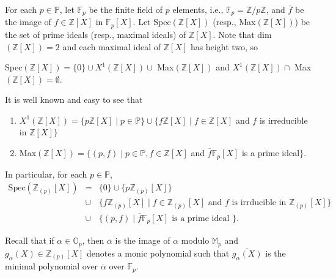 \documentclass[10pt]{article}
\numberwithin{equation}{section}
\theoremstyle{definition}
\theoremstyle{definition}
\newcommand{\F}{\mathbb{F}}
\newcommand{\Q}{\mathbb{Q}}
\newcommand{\Z}{\mathbb{Z}}
\newcommand{\PP}{\mathbb{P}}
\begin{document}
For each $p \in \PP$, let $\mathbb{F}_p$ be the finite field of $p$ elements, i.e., 
$\mathbb{F}_p = \mathbb{Z}/p\mathbb{Z}$, and $\overline{f}$ be the image of $f \in \mathbb{Z}[X]$ in $\mathbb{F}_p[X]$.
Let Spec$(\Z[X])$ (resp., Max$(\Z[X])$) be the set of prime ideals (resp., maximal ideals) of $\Z[X]$.
Note that dim$(\Z[X]) =2$ and each maximal ideal of $\Z[X]$ has height two,
so
\begin{center}
Spec$(\Z[X]) = \{0\} \cup X^1(\Z[X]) \cup$ Max$(\Z[X])$ and $X^1(\Z[X]) \cap$ Max$(\Z[X]) = \emptyset$.
\end{center}
It is well known and easy to see that
\begin{enumerate}
\item[(a)] $X^1(\Z[X]) = \{p\Z[X] \mid p \in \PP\} \cup \{f\Z[X] \mid f\in\Z[X]$ and $f$ is irreducible in $\Z[X]\}$
\item[(b)] Max$(\Z[X]) = \{(p, f) \mid p \in \PP, f\in\Z[X]$ and $\overline{f}\F_p[X]$ is a prime ideal$\}$.
\end{enumerate}
In particular, for each $p \in \PP$,
\begin{eqnarray*}
\text{Spec}(\Z_{(p)}[X]) &=& \{0\} \cup  \{p\Z_{(p)}[X]\}\\
                         &\cup& \{f\Z_{(p)}[X] \mid f\in\Z_{(p)}[X] \text{ and }f \text{ is irrducible in  }\Z_{(p)}[X]\} \\
&\cup&\{(p, f) \mid \overline{f}\F_p[X] \text{ is a prime ideal }\}.
\end{eqnarray*}


Recall that if $\alpha \in \mathbb{O}_p$, then $\overline{\alpha}$ is the image of $\alpha$
modulo $\mathbb{M}_p$ and $g_{\alpha}(X) \in \mathbb{Z}_{(p)}[X]$ denotes a monic polynomial
such that $\overline{g_{\alpha}(X)}$ is the minimal polynomial over $\overline{\alpha}$ over $\mathbb{F}_p$.
\end{document}
